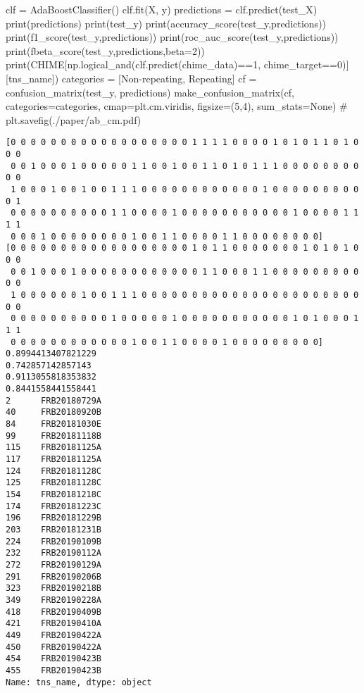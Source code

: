 \documentclass[
  letterpaper,
  DIV=11,
  numbers=noendperiod]{scrartcl}
\newenvironment{Shaded}{\begin{snugshade}}{\end{snugshade}}
\newcommand{\BuiltInTok}[1]{\textcolor[rgb]{0.00,0.23,0.31}{#1}}
\newcommand{\CommentTok}[1]{\textcolor[rgb]{0.37,0.37,0.37}{#1}}
\newcommand{\DecValTok}[1]{\textcolor[rgb]{0.68,0.00,0.00}{#1}}
\newcommand{\NormalTok}[1]{\textcolor[rgb]{0.00,0.23,0.31}{#1}}
\newcommand{\OperatorTok}[1]{\textcolor[rgb]{0.37,0.37,0.37}{#1}}
\newcommand{\StringTok}[1]{\textcolor[rgb]{0.13,0.47,0.30}{#1}}
\newcommand{\VariableTok}[1]{\textcolor[rgb]{0.07,0.07,0.07}{#1}}
\begin{document}
\begin{Shaded}
\begin{Highlighting}[]
\NormalTok{clf }\OperatorTok{=}\NormalTok{ AdaBoostClassifier()}
\NormalTok{clf.fit(X, y)}
\NormalTok{predictions }\OperatorTok{=}\NormalTok{ clf.predict(test\_X)}
\BuiltInTok{print}\NormalTok{(predictions)}
\BuiltInTok{print}\NormalTok{(test\_y)}
\BuiltInTok{print}\NormalTok{(accuracy\_score(test\_y,predictions))}
\BuiltInTok{print}\NormalTok{(f1\_score(test\_y,predictions))}
\BuiltInTok{print}\NormalTok{(roc\_auc\_score(test\_y,predictions))}
\BuiltInTok{print}\NormalTok{(fbeta\_score(test\_y,predictions,beta}\OperatorTok{=}\DecValTok{2}\NormalTok{))}
\BuiltInTok{print}\NormalTok{(CHIME[np.logical\_and(clf.predict(chime\_data)}\OperatorTok{==}\DecValTok{1}\NormalTok{, chime\_target}\OperatorTok{==}\DecValTok{0}\NormalTok{)][}\StringTok{\textquotesingle{}tns\_name\textquotesingle{}}\NormalTok{])}
\NormalTok{categories }\OperatorTok{=}\NormalTok{ [}\StringTok{\textquotesingle{}Non{-}repeating\textquotesingle{}}\NormalTok{, }\StringTok{\textquotesingle{}Repeating\textquotesingle{}}\NormalTok{]}
\NormalTok{cf }\OperatorTok{=}\NormalTok{ confusion\_matrix(test\_y, predictions)}
\NormalTok{make\_confusion\_matrix(cf, }
\NormalTok{                      categories}\OperatorTok{=}\NormalTok{categories,}
\NormalTok{                      cmap}\OperatorTok{=}\NormalTok{plt.cm.viridis,}
\NormalTok{                      figsize}\OperatorTok{=}\NormalTok{(}\DecValTok{5}\NormalTok{,}\DecValTok{4}\NormalTok{),}
\NormalTok{                      sum\_stats}\OperatorTok{=}\VariableTok{None}\NormalTok{)}
\CommentTok{\# plt.savefig(\textquotesingle{}./paper/ab\_cm.pdf\textquotesingle{})}
\end{Highlighting}
\end{Shaded}

\begin{verbatim}
[0 0 0 0 0 0 0 0 0 0 0 0 0 0 0 0 0 0 1 1 1 1 0 0 0 0 1 0 1 0 1 1 0 1 0 0 0
 0 0 1 0 0 0 1 0 0 0 0 0 1 1 0 0 1 0 0 1 1 0 1 0 1 1 1 0 0 0 0 0 0 0 0 0 0
 1 0 0 0 1 0 0 1 0 0 1 1 1 0 0 0 0 0 0 0 0 0 0 0 0 1 0 0 0 0 0 0 0 0 0 0 1
 0 0 0 0 0 0 0 0 0 0 1 1 0 0 0 0 1 0 0 0 0 0 0 0 0 0 0 0 1 0 0 0 0 1 1 1 1
 0 0 0 1 0 0 0 0 0 0 0 0 1 0 0 1 1 0 0 0 0 1 1 0 0 0 0 0 0 0 0]
[0 0 0 0 0 0 0 0 0 0 0 0 0 0 0 0 0 0 1 0 1 1 0 0 0 0 0 0 0 1 0 1 0 1 0 0 0
 0 0 1 0 0 0 1 0 0 0 0 0 0 0 0 0 0 0 0 1 1 0 0 0 1 1 0 0 0 0 0 0 0 0 0 0 0
 1 0 0 0 0 0 0 1 0 0 1 1 1 0 0 0 0 0 0 0 0 0 0 0 0 0 0 0 0 0 0 0 0 0 0 0 0
 0 0 0 0 0 0 0 0 0 0 1 0 0 0 0 0 1 0 0 0 0 0 0 0 0 0 0 0 1 0 1 0 0 0 1 1 1
 0 0 0 0 0 0 0 0 0 0 0 0 1 0 0 1 1 0 0 0 0 1 0 0 0 0 0 0 0 0 0]
0.8994413407821229
0.742857142857143
0.9113055818353832
0.8441558441558441
2      FRB20180729A
40     FRB20180920B
84     FRB20181030E
99     FRB20181118B
115    FRB20181125A
117    FRB20181125A
124    FRB20181128C
125    FRB20181128C
154    FRB20181218C
174    FRB20181223C
196    FRB20181229B
203    FRB20181231B
224    FRB20190109B
232    FRB20190112A
272    FRB20190129A
291    FRB20190206B
323    FRB20190218B
349    FRB20190228A
418    FRB20190409B
421    FRB20190410A
449    FRB20190422A
450    FRB20190422A
454    FRB20190423B
455    FRB20190423B
Name: tns_name, dtype: object
\end{verbatim}
\end{document}
